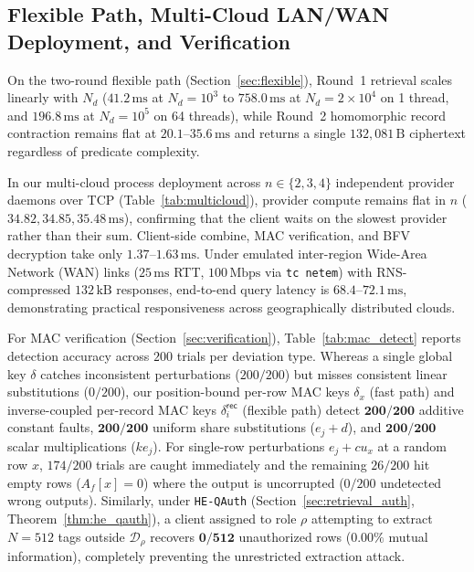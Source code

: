\documentclass[11pt,a4paper]{article}
\begin{document}
\subsection{Flexible Path, Multi-Cloud LAN/WAN Deployment, and Verification}
On the two-round flexible path (Section~\ref{sec:flexible}), Round~1 retrieval scales linearly with $N_d$ ($41.2\,\text{ms}$ at $N_d=10^3$ to $758.0\,\text{ms}$ at $N_d=2\times 10^4$ on 1 thread, and $196.8\,\text{ms}$ at $N_d=10^5$ on 64 threads), while Round~2 homomorphic record contraction remains flat at $20.1\text{--}35.6\,\text{ms}$ and returns a single $132{,}081\,\text{B}$ ciphertext regardless of predicate complexity.

In our multi-cloud process deployment across $n \in \{2, 3, 4\}$ independent provider daemons over TCP (Table~\ref{tab:multicloud}), provider compute remains flat in $n$ ($34.82, 34.85, 35.48\,\text{ms}$), confirming that the client waits on the slowest provider rather than their sum. Client-side combine, MAC verification, and BFV decryption take only $1.37\text{--}1.63\,\text{ms}$. Under emulated inter-region Wide-Area Network (WAN) links ($25\,\text{ms}$ RTT, $100\,\text{Mbps}$ via \texttt{tc netem}) with RNS-compressed $132\,\text{kB}$ responses, end-to-end query latency is $68.4\text{--}72.1\,\text{ms}$, demonstrating practical responsiveness across geographically distributed clouds.

For MAC verification (Section~\ref{sec:verification}), Table~\ref{tab:mac_detect} reports detection accuracy across $200$ trials per deviation type. Whereas a single global key $\delta$ catches inconsistent perturbations ($200/200$) but misses consistent linear substitutions ($0/200$), our position-bound per-row MAC keys $\delta_x$ (fast path) and inverse-coupled per-record MAC keys $\delta_i^{\mathsf{rec}}$ (flexible path) detect $\mathbf{200/200}$ additive constant faults, $\mathbf{200/200}$ uniform share substitutions ($e_j + d$), and $\mathbf{200/200}$ scalar multiplications ($k e_j$). For single-row perturbations $e_j + c u_x$ at a random row $x$, $174/200$ trials are caught immediately and the remaining $26/200$ hit empty rows ($A_f[x]=0$) where the output is uncorrupted ($0/200$ undetected wrong outputs). Similarly, under \texttt{HE-QAuth} (Section~\ref{sec:retrieval_auth}, Theorem~\ref{thm:he_qauth}), a client assigned to role $\rho$ attempting to extract $N = 512$ tags outside $\mathcal{D}_\rho$ recovers $\mathbf{0/512}$ unauthorized rows ($0.00\%$ mutual information), completely preventing the unrestricted extraction attack.
\end{document}
